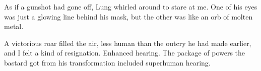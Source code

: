 As if a gunshot had gone off, Lung whirled around to stare at me.  One of his eyes was just a glowing line behind his mask, but the other was like an orb of molten metal.



A victorious roar filled the air, less human than the outcry he had made earlier, and I felt a kind of resignation.  Enhanced hearing.  The package of powers the bastard got from his transformation included superhuman hearing.





